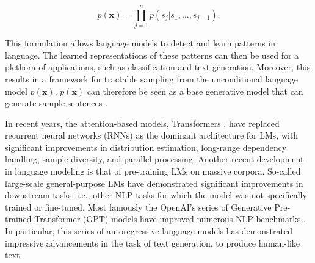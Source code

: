 \begin{equation}
    p(\textbf{x}) = \prod_{j = 1}^n  p(s_j | s_1, ..., s_{j - 1}).
\end{equation}

This formulation allows language models to detect and learn patterns in language. The learned representations of these patterns can then be used for a plethora of applications, such as classification and text generation. Moreover, this results in a framework for tractable sampling from the unconditional language model $p(\textbf{x})$. $p(\textbf{x})$ can therefore be seen as a base generative model that can generate sample sentences \citep{dathathri2019plug}.

In recent years, the attention-based models, Transformers \citep{vaswani2017attention}, have replaced recurrent neural networks (RNNs) as the dominant architecture for LMs, with significant improvements in distribution estimation, long-range dependency handling, sample diversity, and parallel processing. Another recent development in language modeling is that of pre-training LMs on massive corpora. So-called large-scale general-purpose LMs have demonstrated significant improvements in downstream tasks, i.e., other NLP tasks for which the model was not specifically trained or fine-tuned. Most famously the OpenAI's series of Generative Pre-trained Transformer (GPT) models have improved numerous NLP benchmarks \citep{radford2018improving,radford2019language,brown2020language-models-few-shot-gpt3}. In particular, this series of autoregressive language models has demonstrated impressive advancements in the task of text generation, to produce human-like text.




